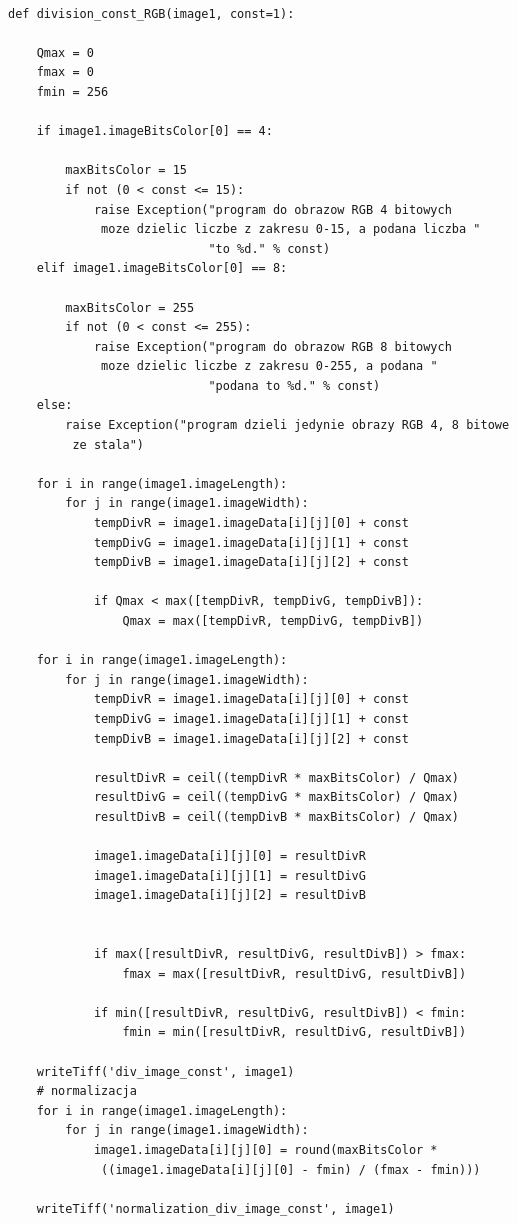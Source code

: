 \documentclass[magisterska,openany]{pracadypl}
\begin{document}
\lstset{language=Python}
\vspace{0.25cm}
\begin{lstlisting}[caption={Dzielnie obrazu przez liczbę}]

def division_const_RGB(image1, const=1):

    Qmax = 0
    fmax = 0
    fmin = 256

    if image1.imageBitsColor[0] == 4:

        maxBitsColor = 15
        if not (0 < const <= 15):
            raise Exception("program do obrazow RGB 4 bitowych
             moze dzielic liczbe z zakresu 0-15, a podana liczba "
                            "to %d." % const)
    elif image1.imageBitsColor[0] == 8:

        maxBitsColor = 255
        if not (0 < const <= 255):
            raise Exception("program do obrazow RGB 8 bitowych
             moze dzielic liczbe z zakresu 0-255, a podana "
                            "podana to %d." % const)
    else:
        raise Exception("program dzieli jedynie obrazy RGB 4, 8 bitowe
         ze stala")

    for i in range(image1.imageLength):
        for j in range(image1.imageWidth):
            tempDivR = image1.imageData[i][j][0] + const
            tempDivG = image1.imageData[i][j][1] + const
            tempDivB = image1.imageData[i][j][2] + const

            if Qmax < max([tempDivR, tempDivG, tempDivB]):
                Qmax = max([tempDivR, tempDivG, tempDivB])

    for i in range(image1.imageLength):
        for j in range(image1.imageWidth):
            tempDivR = image1.imageData[i][j][0] + const
            tempDivG = image1.imageData[i][j][1] + const
            tempDivB = image1.imageData[i][j][2] + const

            resultDivR = ceil((tempDivR * maxBitsColor) / Qmax)
            resultDivG = ceil((tempDivG * maxBitsColor) / Qmax)
            resultDivB = ceil((tempDivB * maxBitsColor) / Qmax)

            image1.imageData[i][j][0] = resultDivR
            image1.imageData[i][j][1] = resultDivG
            image1.imageData[i][j][2] = resultDivB


            if max([resultDivR, resultDivG, resultDivB]) > fmax:
                fmax = max([resultDivR, resultDivG, resultDivB])

            if min([resultDivR, resultDivG, resultDivB]) < fmin:
                fmin = min([resultDivR, resultDivG, resultDivB])

    writeTiff('div_image_const', image1)
    # normalizacja
    for i in range(image1.imageLength):
        for j in range(image1.imageWidth):
            image1.imageData[i][j][0] = round(maxBitsColor *
             ((image1.imageData[i][j][0] - fmin) / (fmax - fmin)))

    writeTiff('normalization_div_image_const', image1)


\end{lstlisting}
\newpage
\end{document}
